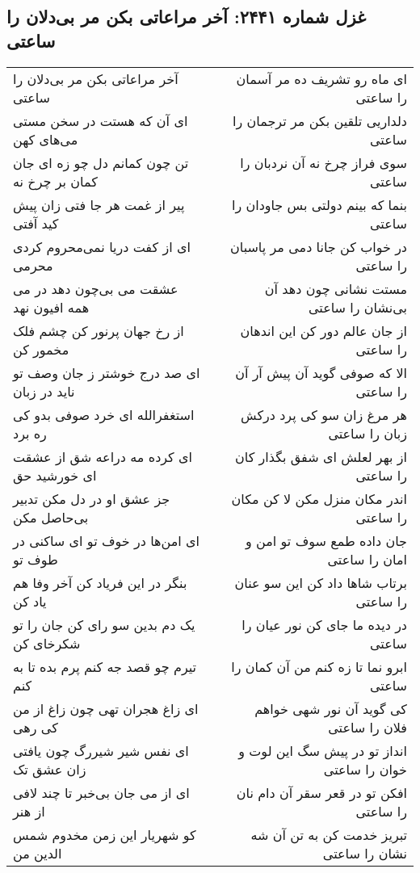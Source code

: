 \begin{center}
\section*{غزل شماره ۲۴۴۱: آخر مراعاتی بکن مر بی‌دلان را ساعتی}
\label{sec:2441}
\begin{longtable}{l p{0.5cm} r}
آخر مراعاتی بکن مر بی‌دلان را ساعتی
&&
ای ماه رو تشریف ده مر آسمان را ساعتی
\\
ای آن که هستت در سخن مستی می‌های کهن
&&
دلداریی تلقین بکن مر ترجمان را ساعتی
\\
تن چون کمانم دل چو زه ای جان کمان بر چرخ نه
&&
سوی فراز چرخ نه آن نردبان را ساعتی
\\
پیر از غمت هر جا فتی زان پیش کید آفتی
&&
بنما که بینم دولتی بس جاودان را ساعتی
\\
ای از کفت دریا نمی‌محروم کردی محرمی
&&
در خواب کن جانا دمی مر پاسبان را ساعتی
\\
عشقت می بی‌چون دهد در می همه افیون نهد
&&
مستت نشانی چون دهد آن بی‌نشان را ساعتی
\\
از رخ جهان پرنور کن چشم فلک مخمور کن
&&
از جان عالم دور کن این اندهان را ساعتی
\\
ای صد درج خوشتر ز جان وصف تو ناید در زبان
&&
الا که صوفی گوید آن پیش آر آن را ساعتی
\\
استغفرالله ای خرد صوفی بدو کی ره برد
&&
هر مرغ زان سو کی پرد درکش زبان را ساعتی
\\
ای کرده مه دراعه شق از عشقت ای خورشید حق
&&
از بهر لعلش ای شفق بگذار کان را ساعتی
\\
جز عشق او در دل مکن تدبیر بی‌حاصل مکن
&&
اندر مکان منزل مکن لا کن مکان را ساعتی
\\
ای امن‌ها در خوف تو ای ساکنی در طوف تو
&&
جان داده طمع سوف تو امن و امان را ساعتی
\\
بنگر در این فریاد کن آخر وفا هم یاد کن
&&
برتاب شاها داد کن این سو عنان را ساعتی
\\
یک دم بدین سو رای کن جان را تو شکرخای کن
&&
در دیده ما جای کن نور عیان را ساعتی
\\
تیرم چو قصد جه کنم پرم بده تا به کنم
&&
ابرو نما تا زه کنم من آن کمان را ساعتی
\\
ای زاغ هجران تهی چون زاغ از من کی رهی
&&
کی گوید آن نور شهی خواهم فلان را ساعتی
\\
ای نفس شیر شیررگ چون یافتی زان عشق تک
&&
انداز تو در پیش سگ این لوت و خوان را ساعتی
\\
ای از می جان بی‌خبر تا چند لافی از هنر
&&
افکن تو در قعر سقر آن دام نان را ساعتی
\\
کو شهریار این زمن مخدوم شمس الدین من
&&
تبریز خدمت کن به تن آن شه نشان را ساعتی
\\
\end{longtable}
\end{center}
